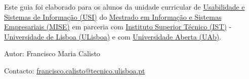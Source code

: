 \documentclass{tufte-book} %
\begin{document}
Este guia foi elaborado para os alunos da unidade curricular de \href{https://fenix.tecnico.ulisboa.pt/cursos/mise/disciplina-curricular/1529008521544}{Usabilidade e Sistemas de Informação (USI)} do \href{https://fenix.tecnico.ulisboa.pt/cursos/mise}{Mestrado em Informação e Sistemas Empresariais (MISE)} em parceria com \href{https://tecnico.ulisboa.pt/}{Instituto Superior Técnico (IST)} - \href{http://www.ulisboa.pt/}{Universidade de Lisboa (ULisboa)} e com \href{http://www.uab.pt/}{Universidade Aberta (UAb)}.

\vspace{2.5cm}

Autor: Francisco Maria Calisto

Contacto: \href{francisco.calisto@tecnico.ulisboa.pt}{francisco.calisto@tecnico.ulisboa.pt}




\printindex
\end{document}
